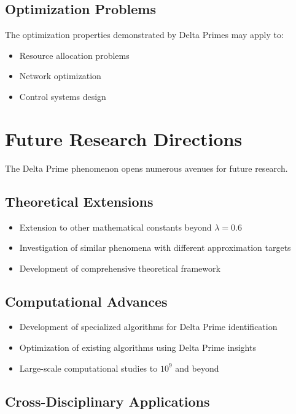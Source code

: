 \documentclass[12pt,a4paper]{report}
\newcommand{\lambdaval}{\lambda}
\begin{document}
\begin{itemize}
\subsection{Optimization Problems}

The optimization properties demonstrated by Delta Primes may apply to:
\begin{itemize}
\item Resource allocation problems
\item Network optimization
\item Control systems design
\end{itemize}

\section{Future Research Directions}

The Delta Prime phenomenon opens numerous avenues for future research.

\subsection{Theoretical Extensions}

\begin{itemize}
\item Extension to other mathematical constants beyond $\lambdaval = 0.6$
\item Investigation of similar phenomena with different approximation targets
\item Development of comprehensive theoretical framework
\end{itemize}

\subsection{Computational Advances}

\begin{itemize}
\item Development of specialized algorithms for Delta Prime identification
\item Optimization of existing algorithms using Delta Prime insights
\item Large-scale computational studies to $10^9$ and beyond
\end{itemize}

\subsection{Cross-Disciplinary Applications}


\end{itemize}
\end{document}
